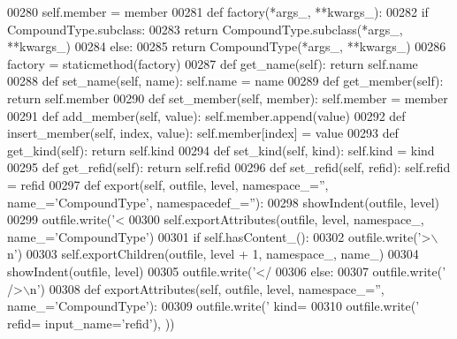 \begin{DoxyCode}
{{{{{{{{{{{{{{{{{{{{{{{{00280             self.member = member
00281     \textcolor{keyword}{def }factory(*args\_, **kwargs\_):
00282         \textcolor{keywordflow}{if} CompoundType.subclass:
00283             \textcolor{keywordflow}{return} CompoundType.subclass(*args\_, **kwargs\_)
00284         \textcolor{keywordflow}{else}:
00285             \textcolor{keywordflow}{return} CompoundType(*args\_, **kwargs\_)
00286     factory = staticmethod(factory)
00287     \textcolor{keyword}{def }get_name(self): \textcolor{keywordflow}{return} self.name
00288     \textcolor{keyword}{def }set_name(self, name): self.name = name
00289     \textcolor{keyword}{def }get_member(self): \textcolor{keywordflow}{return} self.member
00290     \textcolor{keyword}{def }set_member(self, member): self.member = member
00291     \textcolor{keyword}{def }add_member(self, value): self.member.append(value)
00292     \textcolor{keyword}{def }insert_member(self, index, value): self.member[index] = value
00293     \textcolor{keyword}{def }get_kind(self): \textcolor{keywordflow}{return} self.kind
00294     \textcolor{keyword}{def }set_kind(self, kind): self.kind = kind
00295     \textcolor{keyword}{def }get_refid(self): \textcolor{keywordflow}{return} self.refid
00296     \textcolor{keyword}{def }set_refid(self, refid): self.refid = refid
00297     \textcolor{keyword}{def }export(self, outfile, level, namespace\_='', name\_='CompoundType', namespacedef\_=''):
00298         showIndent(outfile, level)
00299         outfile.write(\textcolor{stringliteral}{'<%
00300         self.exportAttributes(outfile, level, namespace\_, name\_=\textcolor{stringliteral}{'CompoundType'})
00301         \textcolor{keywordflow}{if} self.hasContent_():
00302             outfile.write(\textcolor{stringliteral}{'>\(\backslash\)n'})
00303             self.exportChildren(outfile, level + 1, namespace\_, name\_)
00304             showIndent(outfile, level)
00305             outfile.write(\textcolor{stringliteral}{'</%
00306         \textcolor{keywordflow}{else}:
00307             outfile.write(\textcolor{stringliteral}{' />\(\backslash\)n'})
00308     \textcolor{keyword}{def }exportAttributes(self, outfile, level, namespace\_='', name\_='CompoundType'):
00309         outfile.write(\textcolor{stringliteral}{' kind=%
00310         outfile.write(\textcolor{stringliteral}{' refid=%
      input\_name=\textcolor{stringliteral}{'refid'}), ))
}}}}}}}}}}}}}}}}}}}}}}}}}}}}
\end{DoxyCode}
